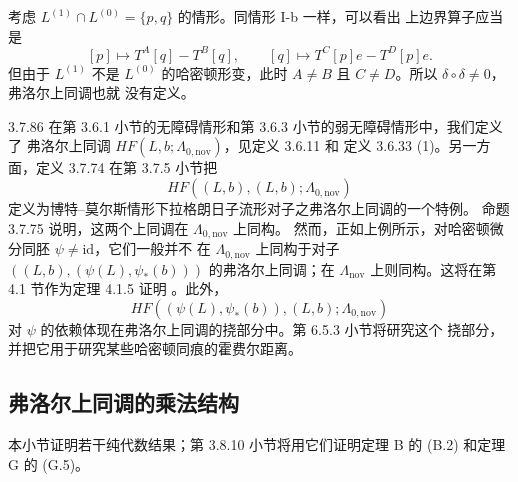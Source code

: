 考虑 $L^{(1)}\cap L^{(0)}=\{p,q\}$ 的情形。同情形 I-b 一样，可以看出
上边界算子应当是
\[
 [p]\longmapsto T^A[q]-T^B[q],
 \qquad
 [q]\longmapsto T^C[p]e-T^D[p]e.
\]
但由于 $L^{(1)}$ 不是 $L^{(0)}$ 的哈密顿形变，此时
$A\ne B$ 且 $C\ne D$。所以 $\delta\circ\delta\ne0$，弗洛尔上同调也就
没有定义。

\begin{remark}{3.7.86}\label{rem:3-7-86}
在第 3.6.1 小节的无障碍情形和第 3.6.3 小节的弱无障碍情形中，我们定义了
弗洛尔上同调 $HF(L,b;\Lambda_{0,\mathrm{nov}})$，见定义 3.6.11 和
定义 3.6.33 (1)。另一方面，定义 3.7.74 在第 3.7.5 小节把
\[
 HF((L,b),(L,b);\Lambda_{0,\mathrm{nov}})
\]
定义为博特--莫尔斯情形下拉格朗日子流形对子之弗洛尔上同调的一个特例。
命题 3.7.75 说明，这两个上同调在 $\Lambda_{0,\mathrm{nov}}$ 上同构。
然而，正如上例所示，对哈密顿微分同胚 $\psi\ne\mathrm{id}$，它们一般并不
在 $\Lambda_{0,\mathrm{nov}}$ 上同构于对子
$((L,b),(\psi(L),\psi_*(b)))$ 的弗洛尔上同调；在
$\Lambda_{\mathrm{nov}}$ 上则同构。这将在第 4.1 节作为定理 4.1.5 证明
。此外，
\[
 HF((\psi(L),\psi_*(b)),(L,b);\Lambda_{0,\mathrm{nov}})
\]
对 $\psi$ 的依赖体现在弗洛尔上同调的挠部分中。第 6.5.3 小节将研究这个
挠部分，并把它用于研究某些哈密顿同痕的霍费尔距离。
\end{remark}

\subsection{弗洛尔上同调的乘法结构}
\label{subsec:3-7-7}

本小节证明若干纯代数结果；第 3.8.10 小节将用它们证明定理 B 的 (B.2)
和定理 G 的 (G.5)。

